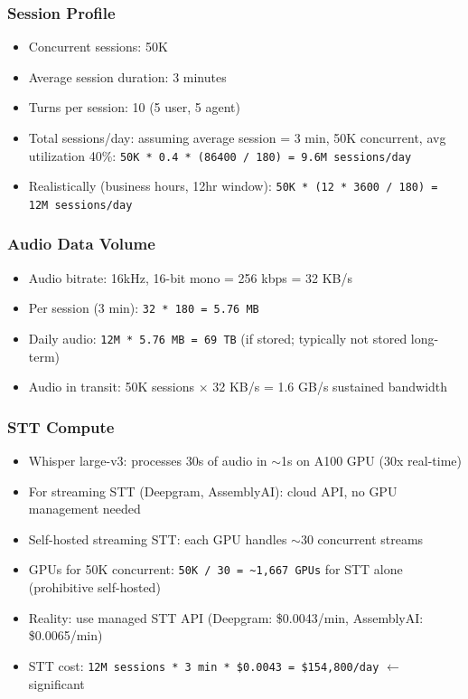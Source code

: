 \subsubsection*{Session Profile}
\begin{itemize}
  \item Concurrent sessions: 50K
  \item Average session duration: 3 minutes
  \item Turns per session: 10 (5 user, 5 agent)
  \item Total sessions/day: assuming average session = 3 min, 50K concurrent, avg utilization 40\%: \texttt{50K * 0.4 * (86400 / 180) = 9.6M sessions/day}
  \item Realistically (business hours, 12hr window): \texttt{50K * (12 * 3600 / 180) = 12M sessions/day}
\end{itemize}

\subsubsection*{Audio Data Volume}
\begin{itemize}
  \item Audio bitrate: 16kHz, 16-bit mono = 256 kbps = 32 KB/s
  \item Per session (3 min): \texttt{32 * 180 = 5.76 MB}
  \item Daily audio: \texttt{12M * 5.76 MB = 69 TB} (if stored; typically not stored long-term)
  \item Audio in transit: 50K sessions $\times$ 32 KB/s = 1.6 GB/s sustained bandwidth
\end{itemize}

\subsubsection*{STT Compute}
\begin{itemize}
  \item Whisper large-v3: processes 30s of audio in $\sim$1s on A100 GPU (30x real-time)
  \item For streaming STT (Deepgram, AssemblyAI): cloud API, no GPU management needed
  \item Self-hosted streaming STT: each GPU handles $\sim$30 concurrent streams
  \item GPUs for 50K concurrent: \texttt{50K / 30 = \textasciitilde{}1,667 GPUs} for STT alone (prohibitive self-hosted)
  \item Reality: use managed STT API (Deepgram: \$0.0043/min, AssemblyAI: \$0.0065/min)
  \item STT cost: \texttt{12M sessions * 3 min * \$0.0043 = \$154,800/day} $\leftarrow$ significant
\end{itemize}

